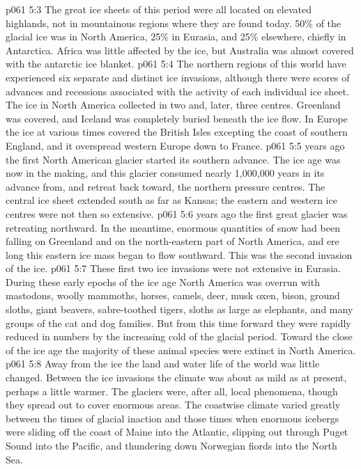 \vs p061 5:3 The great ice sheets of this period were all located on elevated highlands, not in mountainous regions where they are found today. 50\% of the glacial ice was in North America, 25\% in Eurasia, and 25\% elsewhere, chiefly in Antarctica. Africa was little affected by the ice, but Australia was almost covered with the antarctic ice blanket.
\vs p061 5:4 The northern regions of this world have experienced six separate and distinct ice invasions, although there were scores of advances and recessions associated with the activity of each individual ice sheet. The ice in North America collected in two and, later, three centres. Greenland was covered, and Iceland was completely buried beneath the ice flow. In Europe the ice at various times covered the British Isles excepting the coast of southern England, and it overspread western Europe down to France.
\vs p061 5:5 \pc {} years ago the first North American glacier started its southern advance. The ice age was now in the making, and this glacier consumed nearly 1,000,000 years in its advance from, and retreat back toward, the northern pressure centres. The central ice sheet extended south as far as Kansas; the eastern and western ice centres were not then so extensive.
\vs p061 5:6 \pc {} years ago the first great glacier was retreating northward. In the meantime, enormous quantities of snow had been falling on Greenland and on the north\hyp{}eastern part of North America, and ere long this eastern ice mass began to flow southward. This was the second invasion of the ice.
\vs p061 5:7 These first two ice invasions were not extensive in Eurasia. During these early epochs of the ice age North America was overrun with mastodons, woolly mammoths, horses, camels, deer, musk oxen, bison, ground sloths, giant beavers, sabre\hyp{}toothed tigers, sloths as large as elephants, and many groups of the cat and dog families. But from this time forward they were rapidly reduced in numbers by the increasing cold of the glacial period. Toward the close of the ice age the majority of these animal species were extinct in North America.
\vs p061 5:8 Away from the ice the land and water life of the world was little changed. Between the ice invasions the climate was about as mild as at present, perhaps a little warmer. The glaciers were, after all, local phenomena, though they spread out to cover enormous areas. The coastwise climate varied greatly between the times of glacial inaction and those times when enormous icebergs were sliding off the coast of Maine into the Atlantic, slipping out through Puget Sound into the Pacific, and thundering down Norwegian fiords into the North Sea.
